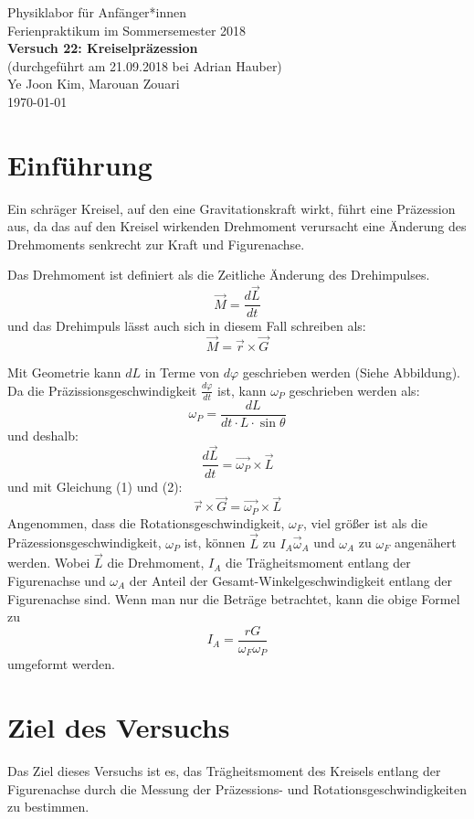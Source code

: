 \documentclass[11pt,a4paper]{article} %
\begin{document}
{
	\centering 
	\large 
	Physiklabor für Anfänger*innen \\
	Ferienpraktikum im Sommersemester 2018 \\[4mm]
	\textbf{\LARGE 
		Versuch 22: Kreiselpräzession
	} \\[3mm]
	(durchgeführt am 21.09.2018 bei Adrian Hauber) \\
	Ye Joon Kim, Marouan Zouari\\
	\today \\[10mm]
}

\section{Einführung}
Ein schräger Kreisel, auf den eine Gravitationskraft wirkt, führt eine Präzession aus, da das auf den Kreisel wirkenden Drehmoment verursacht eine Änderung des Drehmoments senkrecht zur Kraft und Figurenachse.

Das Drehmoment ist definiert als die Zeitliche Änderung des Drehimpulses. 
\begin{equation}
\vec{M} = \frac{d\vec{L}}{dt}
\end{equation}
und das Drehimpuls lässt auch sich in diesem Fall schreiben als:
\begin{equation}
\vec{M} =\vec{r}\times\vec{G}
\end{equation}

Mit Geometrie kann $dL$ in Terme von $d\varphi$ geschrieben werden (Siehe Abbildung). Da die Präzissionsgeschwindigkeit $\frac{d\varphi}{dt}$ ist, kann $\omega_P$ geschrieben werden als:
$$\omega_P = \frac{dL}{dt\cdot L\cdot \sin\theta}$$
und deshalb:
$$\frac{d\vec{L}}{dt} = \vec{\omega_P}\times \vec{L}$$
und mit Gleichung (1) und (2):
$$\vec{r}\times \vec{G} = \vec{\omega_P}\times \vec{L}$$
Angenommen, dass die Rotationsgeschwindigkeit, $\omega_F$, viel größer ist als die Präzessionsgeschwindigkeit, $\omega_P$ ist, können $\vec{L}$ zu $I_A\vec{\omega}_A$ und $\omega_A$ zu $\omega_F$ angenähert werden. Wobei $\vec{L}$ die Drehmoment, $I_A$ die Trägheitsmoment entlang der Figurenachse und $\omega_A$ der Anteil der Gesamt-Winkelgeschwindigkeit entlang der Figurenachse sind. Wenn man nur die Beträge betrachtet, kann die obige Formel zu 
\begin{equation}
I_A = \frac{rG}{\omega_F \omega_P}
\end{equation}
umgeformt werden.

\section{Ziel des Versuchs}
Das Ziel dieses Versuchs ist es, das Trägheitsmoment des Kreisels entlang der Figurenachse durch die Messung der Präzessions- und Rotationsgeschwindigkeiten zu bestimmen.
\end{document}

